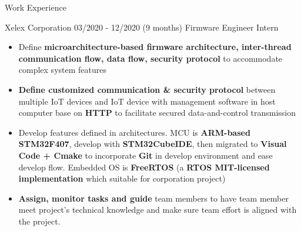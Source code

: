 \documentclass{resume} %
\begin{document}
\begin{rSection}{Work Experience}
\begin{rCompanySubsection}
\begin{itemize}
\end{itemize}
\end{rCompanySubsection}

\begin{rCompanySubsection}
    {Xelex Corporation}
    {03/2020 - 12/2020 (9 months)}
    {Firmware Engineer Intern}
    {}
\begin{itemize}
     \item Define {\bf microarchitecture-based firmware architecture, inter-thread communication flow, data flow, security protocol} to accommodate complex system features
     \item \textbf{Define customized communication \& security protocol} between multiple IoT devices and IoT device with management software in host computer base on \textbf{HTTP} to facilitate secured data-and-control transmission
     \item Develop features defined in architectures. MCU is {\bf ARM-based STM32F407}, develop with {\bf STM32CubeIDE}, then migrated to {\bf Visual Code + Cmake} to incorporate {\bf Git} in develop environment and ease develop flow. Embedded OS is {\bf FreeRTOS} (a  {\bf RTOS MIT-licensed implementation} which suitable for corporation project)
     \item {\bf Assign, monitor tasks and guide} team members to have team member meet project's technical knowledge and make sure team effort is aligned with the project.

\end{itemize}
\end{rCompanySubsection}




\end{rSection}
\end{document}
